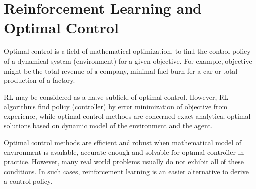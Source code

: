 \section{Reinforcement Learning and Optimal Control}
\label{sec:rl_and_control}

Optimal control is a field of mathematical optimization, to find the control policy of a dynamical system (environment) for a given objective. 
For example, objective might be the total revenue of a company, 
minimal fuel burn for a car or total production of a factory. 

RL may be considered as a naive subfield of optimal control. 
However, RL algorithms find policy (controller) by error minimization of objective from experience, 
while optimal control methods are concerned exact analytical optimal solutions based on dynamic model of the environment and the agent. 

Optimal control methods are efficient and robust when mathematical model of environment is available, 
accurate enough and solvable for optimal controller in practice. 
However, many real world problems usually do not exhibit all of these conditions. 
In such cases, reinforcement learning is an easier alternative to derive a control policy.
